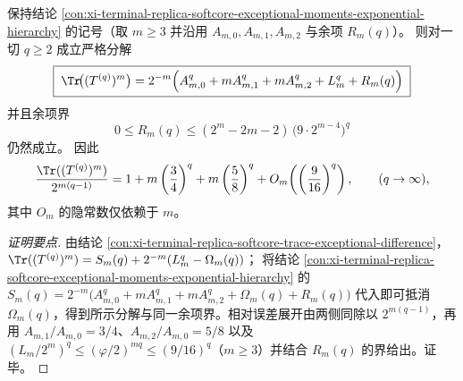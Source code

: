 \begin{conclusion}[全迹矩的三项主导展开与显式余项界]\label{con:xi-terminal-replica-softcore-trace-moments-exponential-hierarchy}
保持结论 \ref{con:xi-terminal-replica-softcore-exceptional-moments-exponential-hierarchy} 的记号（取 \(m\ge 3\) 并沿用 \(A_{m,0},A_{m,1},A_{m,2}\) 与余项 \(R_m(q)\)）。
则对一切 \(q\ge 2\) 成立严格分解
\[
\boxed{\;
\Tr\!\bigl((T^{(q)})^m\bigr)
=2^{-m}\Big(A_{m,0}^{q}+mA_{m,1}^{q}+mA_{m,2}^{q}+L_m^{q}+R_m(q)\Big)\;}
\]
并且余项界
\[
0\le R_m(q)\le (2^{m}-2m-2)\,\bigl(9\cdot 2^{m-4}\bigr)^{q}
\]
仍然成立。
因此
\[
\frac{\Tr((T^{(q)})^m)}{2^{m(q-1)}}
=1+m\left(\frac34\right)^{q}
+m\left(\frac58\right)^{q}
+O_m\!\left(\left(\frac{9}{16}\right)^{q}\right),
\qquad (q\to\infty),
\]
其中 \(O_m\) 的隐常数仅依赖于 \(m\)。
\end{conclusion}
\begin{proof}[证明要点]
由结论 \ref{con:xi-terminal-replica-softcore-trace-exceptional-difference}，
\(
\Tr((T^{(q)})^m)=S_m(q)+2^{-m}(L_m^q-\Omega_m(q))
\)；
将结论 \ref{con:xi-terminal-replica-softcore-exceptional-moments-exponential-hierarchy} 的
\(
S_m(q)=2^{-m}\bigl(A_{m,0}^{q}+mA_{m,1}^{q}+mA_{m,2}^{q}+\Omega_m(q)+R_m(q)\bigr)
\)
代入即可抵消 \(\Omega_m(q)\)，得到所示分解与同一余项界。相对误差展开由两侧同除以 \(2^{m(q-1)}\)，再用 \(A_{m,1}/A_{m,0}=3/4\)、\(A_{m,2}/A_{m,0}=5/8\) 以及 \((L_m/2^m)^q\le (\varphi/2)^{mq}\le (9/16)^q\)（\(m\ge 3\)）并结合 \(R_m(q)\) 的界给出。证毕。
\end{proof}

\endinput

